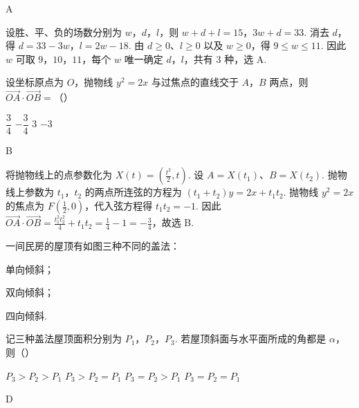 \begin{answer}
A
\end{answer}

\begin{solution}
设胜、平、负的场数分别为 \(w\)，\(d\)，\(l\)，则
\(w+d+l=15\)，\(3w+d=33\).
消去 \(d\)，得 \(d=33-3w\)，\(l=2w-18\). 由 \(d\geq0\)、\(l\geq0\) 以及 \(w\geq0\)，得 \(9\leq w\leq11\). 因此 \(w\) 可取 \(9\)，\(10\)，\(11\)，每个 \(w\) 唯一确定 \(d\)，\(l\)，共有 \(3\) 种，选 A.
\end{solution}

\begin{problem}
设坐标原点为 \(O\)，抛物线 \(y^2 = 2x\) 与过焦点的直线交于 \(A\)，\(B\) 两点，则 \(\overrightarrow{OA} \cdot \overrightarrow{OB} =\)（\quad）

\choices
    {\(\dfrac{3}{4}\)}
    {\(-\dfrac{3}{4}\)}
    {\(3\)}
    {\(-3\)}
\end{problem}

\begin{answer}
B
\end{answer}

\begin{solution}
将抛物线上的点参数化为 \(X(t)=\left(\frac{t^2}{2},t\right)\). 设 \(A=X(t_1)\)、\(B=X(t_2)\). 抛物线上参数为 \(t_1\)，\(t_2\) 的两点所连弦的方程为
\((t_1+t_2)y=2x+t_1t_2\). 抛物线 \(y^2=2x\) 的焦点为 \(F\left(\frac12,0\right)\)，代入弦方程得 \(t_1t_2=-1\). 因此 \(\overrightarrow{OA}\cdot\overrightarrow{OB}=\frac{t_1^2t_2^2}{4}+t_1t_2=\frac14-1=-\frac34\)，故选 B.
\end{solution}

\begin{problem}
一间民房的屋顶有如图三种不同的盖法：
\begin{circlelist}
\item 单向倾斜；
\item 双向倾斜；
\item 四向倾斜.
\end{circlelist}
记三种盖法屋顶面积分别为 \(P_1\)，\(P_2\)，\(P_3\). 若屋顶斜面与水平面所成的角都是 \(\alpha\)，则（\quad）


\choices
    {\(P_3 > P_2 > P_1\)}
    {\(P_3 > P_2 = P_1\)}
    {\(P_3 = P_2 > P_1\)}
    {\(P_3 = P_2 = P_1\)}
\end{problem}

\begin{answer}
D
\end{answer}

